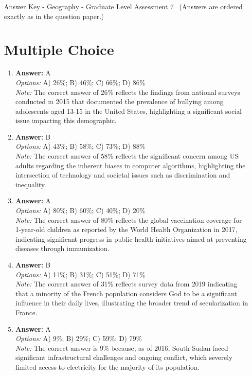 \documentclass[12pt]{article}
\begin{document}
\begin{center}
Answer Key - Geography - Graduate Level Assessment 7 \
\small (Answers are ordered exactly as in the question paper.)
\end{center}

\section*{Multiple Choice}
\begin{enumerate}[label=\arabic*.]
\item \textbf{Answer:} A
\\ \textit{Options:} A) 26\%; B) 46\%; C) 66\%; D) 86\%
\\ \textit{Note:} The correct answer of 26\% reflects the findings from national surveys conducted in 2015 that documented the prevalence of bullying among adolescents aged 13-15 in the United States, highlighting a significant social issue impacting this demographic.
\item \textbf{Answer:} B
\\ \textit{Options:} A) 43\%; B) 58\%; C) 73\%; D) 88\%
\\ \textit{Note:} The correct answer of 58\% reflects the significant concern among US adults regarding the inherent biases in computer algorithms, highlighting the intersection of technology and societal issues such as discrimination and inequality.
\item \textbf{Answer:} A
\\ \textit{Options:} A) 80\%; B) 60\%; C) 40\%; D) 20\%
\\ \textit{Note:} The correct answer of 80\% reflects the global vaccination coverage for 1-year-old children as reported by the World Health Organization in 2017, indicating significant progress in public health initiatives aimed at preventing diseases through immunization.
\item \textbf{Answer:} B
\\ \textit{Options:} A) 11\%; B) 31\%; C) 51\%; D) 71\%
\\ \textit{Note:} The correct answer of 31\% reflects survey data from 2019 indicating that a minority of the French population considers God to be a significant influence in their daily lives, illustrating the broader trend of secularization in France.
\item \textbf{Answer:} A
\\ \textit{Options:} A) 9\%; B) 29\%; C) 59\%; D) 79\%
\\ \textit{Note:} The correct answer is 9\% because, as of 2016, South Sudan faced significant infrastructural challenges and ongoing conflict, which severely limited access to electricity for the majority of its population.
\end{enumerate}
\end{document}
